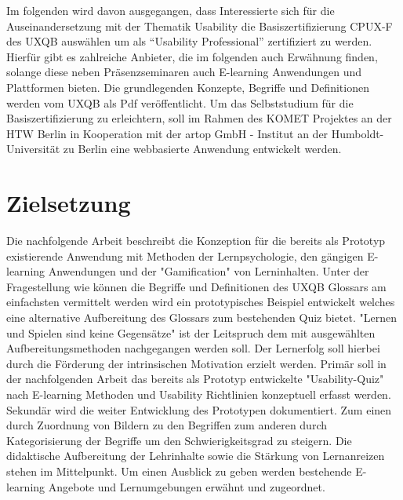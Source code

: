 \documentclass[a4paper, 12pt, twoside, BCOR=20mm, DIV=calc, abstracton, parskip=half*, toc=bibliography, toc=listof, headsepline, footsepline, headings=small, numbers=enddot]{scrreprt}
\begin{document}
	Im folgenden wird davon ausgegangen, dass Interessierte sich für die Auseinandersetzung mit der Thematik Usability die Basiszertifizierung \ac{CPUX}-F des \ac{UXQB} auswählen um als "`Usability Professional"' zertifiziert zu werden. Hierfür gibt es zahlreiche Anbieter, die im folgenden auch Erwähnung finden, solange diese neben Präsenzseminaren auch E-learning Anwendungen und Plattformen bieten. 
	Die grundlegenden Konzepte, Begriffe und Definitionen werden vom \ac{UXQB} als Pdf veröffentlicht\cite{cpux-f}. Um das Selbststudium für die Basiszertifizierung zu erleichtern, soll im Rahmen des KOMET Projektes an der \ac{HTW Berlin} %
	in Kooperation mit der artop GmbH - Institut an der Humboldt-Universität zu Berlin eine webbasierte Anwendung entwickelt werden\cite{KOMET}. 
	
		
	\section{Zielsetzung}
	Die nachfolgende Arbeit beschreibt die Konzeption für die bereits als Prototyp existierende Anwendung mit Methoden der Lernpsychologie, den gängigen E-learning Anwendungen und der "Gamification" von Lerninhalten. Unter der Fragestellung wie können die Begriffe und Definitionen des \ac{UXQB} Glossars am einfachsten vermittelt werden wird ein prototypisches Beispiel entwickelt welches eine alternative Aufbereitung des Glossars zum bestehenden Quiz bietet. "Lernen und Spielen sind keine Gegensätze" \cite{dewey1995erfahrung}
	ist der Leitspruch dem mit ausgewählten Aufbereitungsmethoden nachgegangen werden soll. Der Lernerfolg soll hierbei durch die Förderung der intrinsischen Motivation erzielt werden. 
	Primär soll in der nachfolgenden Arbeit das bereits als Prototyp entwickelte "Usability-Quiz" nach E-learning Methoden und Usability Richtlinien konzeptuell erfasst werden. Sekundär wird die weiter Entwicklung des Prototypen dokumentiert. Zum einen durch Zuordnung von Bildern zu den Begriffen zum anderen durch Kategorisierung der Begriffe um den Schwierigkeitsgrad zu steigern. Die didaktische Aufbereitung der Lehrinhalte sowie die Stärkung von Lernanreizen stehen im Mittelpunkt. Um einen Ausblick zu geben werden bestehende E-learning Angebote und Lernumgebungen erwähnt und zugeordnet. 
	
\end{document}

